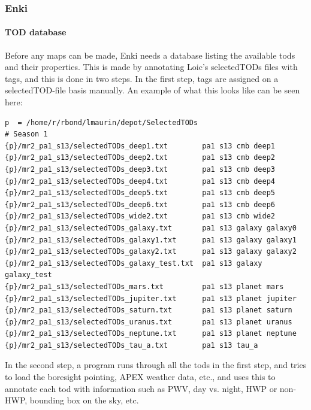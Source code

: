 \documentclass[a4paper, 11pt]{article}
\begin{document}
\subsubsection{Enki}
\paragraph{TOD database}
Before any maps can be made, Enki needs a database listing the available tods and their properties.
This is made by annotating Loic's selectedTODs files with tags, and this is done in two steps.
In the first step, tags are assigned on a selectedTOD-file basis manually. An example of what this
looks like can be seen here:
\begin{verbatim}
p  = /home/r/rbond/lmaurin/depot/SelectedTODs
# Season 1
{p}/mr2_pa1_s13/selectedTODs_deep1.txt        pa1 s13 cmb deep1
{p}/mr2_pa1_s13/selectedTODs_deep2.txt        pa1 s13 cmb deep2
{p}/mr2_pa1_s13/selectedTODs_deep3.txt        pa1 s13 cmb deep3
{p}/mr2_pa1_s13/selectedTODs_deep4.txt        pa1 s13 cmb deep4
{p}/mr2_pa1_s13/selectedTODs_deep5.txt        pa1 s13 cmb deep5
{p}/mr2_pa1_s13/selectedTODs_deep6.txt        pa1 s13 cmb deep6
{p}/mr2_pa1_s13/selectedTODs_wide2.txt        pa1 s13 cmb wide2
{p}/mr2_pa1_s13/selectedTODs_galaxy.txt       pa1 s13 galaxy galaxy0
{p}/mr2_pa1_s13/selectedTODs_galaxy1.txt      pa1 s13 galaxy galaxy1
{p}/mr2_pa1_s13/selectedTODs_galaxy2.txt      pa1 s13 galaxy galaxy2
{p}/mr2_pa1_s13/selectedTODs_galaxy_test.txt  pa1 s13 galaxy galaxy_test
{p}/mr2_pa1_s13/selectedTODs_mars.txt         pa1 s13 planet mars
{p}/mr2_pa1_s13/selectedTODs_jupiter.txt      pa1 s13 planet jupiter
{p}/mr2_pa1_s13/selectedTODs_saturn.txt       pa1 s13 planet saturn
{p}/mr2_pa1_s13/selectedTODs_uranus.txt       pa1 s13 planet uranus
{p}/mr2_pa1_s13/selectedTODs_neptune.txt      pa1 s13 planet neptune
{p}/mr2_pa1_s13/selectedTODs_tau_a.txt        pa1 s13 tau_a
\end{verbatim}
In the second step, a program runs through all the tods in the first step, and tries
to load the boresight pointing, APEX weather data, etc., and uses this to annotate each
tod with information such as PWV, day vs. night, HWP or non-HWP, bounding box on the sky, etc.
\end{document}
